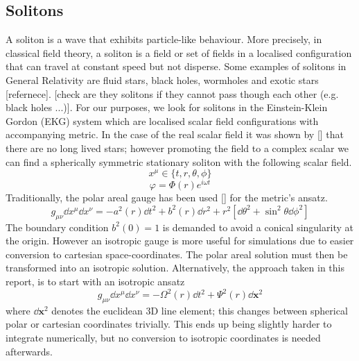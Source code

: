 \subsection{Solitons}
A soliton is a wave that exhibits particle-like behaviour. More precisely, in classical field theory, a soliton is a field or set of fields in a localised configuration that can travel at constant speed but not disperse. Some examples of solitons in General Relativity are fluid stars, black holes, wormholes and exotic stars [refernece]. [check are they solitons if they cannot pass though each other (e.g. black holes ...)]. For our purposes, we look for solitons in the Einstein-Klein Gordon (EKG) system which are localised scalar field configurations with accompanying metric. In the case of the real scalar field it was shown by [] that there are no long lived stars; however promoting the field to a complex scalar we can find a spherically symmetric stationary soliton with the following scalar field.
$$ x^\mu \in \{t,r,\theta,\phi \}$$
\begin{equation} \varphi = \Phi(r)e^{i\omega t} \end{equation}
Traditionally, the polar areal gauge has been used [] for the metric's ansatz.
\begin{equation}g_{\mu\nu}\dd x^\mu \dd x^\nu =- a^2(r)\dd t^2 + b^2(r) \dd r^2 + r^2 \left[ \dd \theta^2 + \sin^2\theta \dd \phi^2\right]\end{equation}
The boundary condition $b^2(0)=1$ is demanded to avoid a conical singularity at the origin. However an isotropic gauge is more useful for simulations due to easier conversion to cartesian space-coordinates. The polar areal solution must then be transformed into an isotropic solution. Alternatively, the approach taken in this report, is to start with an isotropic ansatz
\begin{equation} g_{\mu\nu}\dd x^\mu \dd x^\nu =- \Omega^2(r)\dd t^2 + \Psi^2(r)\dd \bm{x}^2\end{equation}
where $\dd \bm{x}^2$ denotes the euclidean 3D line element; this changes between spherical polar or cartesian coordinates trivially. This ends up being slightly harder to integrate numerically, but no conversion to isotropic coordinates is needed afterwards.

